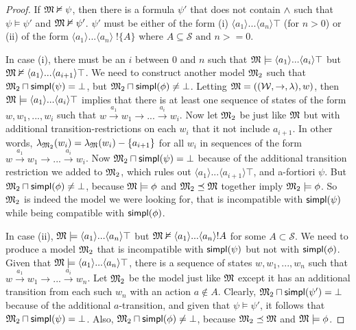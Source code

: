 \begin{proof}
If $\frak{M} \nvDash \psi$, then there is a formula $\psi'$ that does not contain
$\land$ such that $\psi \models \psi'$ and $\frak{M} \nvDash \psi'$. $\psi'$ must be
either of the form (i) $\langle a_1 \rangle ... \langle a_n \rangle
\top$ (for $n > 0$) or (ii) of the form $\langle a_1 \rangle
... \langle a_n \rangle \; !\{A\}$ where $A \subseteq \mathcal{S}
\mbox{ and } n >= 0$.

In case (i), there must be an $i$ between $0$ and $n$ such that $\frak{M}
\models \langle a_1 \rangle ... \langle a_i \rangle \top$ but $\frak{M}
\nvDash \langle a_1 \rangle ... \langle a_{i+1} \rangle \top$. We need
to construct another model $\frak{M}_2$ such that $\frak{M}_2 \sqcap \mathsf{simpl}(\psi) = \bot$,
but $\frak{M}_2 \sqcap \mathsf{simpl}(\phi) \neq \bot$. Letting $\frak{M} =
((\mathcal{W},\rightarrow,\lambda),w)$, then $\frak{M} \models \langle a_1
\rangle ... \langle a_i \rangle \top$ implies that there is at least
one sequence of states of the form $w, w_1, ..., w_i$ such that $w
\xrightarrow{a_1} w_1 \rightarrow ... \xrightarrow{a_i} w_i$.  Now let
$\frak{M}_2$ be just like $\frak{M}$ but with additional transition-restrictions on
each $w_i$ that it not include $a_{i+1}$.  In other words,
$\lambda_{\frak{M}_2}(w_i) = \lambda_\frak{M}(w_i) - \{a_{i+1}\}$ for all $w_i$ in
sequences of the form $w \xrightarrow{a_1} w_1 \rightarrow
... \xrightarrow{a_i} w_i$. Now $\frak{M}_2 \sqcap \mathsf{simpl}(\psi) = \bot$ because of
the additional transition restriction we added to $\frak{M}_2$, which rules out
$\langle a_1 \rangle ... \langle a_{i+1} \rangle \top$, and
a-fortiori $\psi$. But $\frak{M}_2 \sqcap \mathsf{simpl}(\phi) \neq \bot$, because $\frak{M}
\models \phi$ and $\frak{M}_2 \preceq \frak{M}$ together imply $\frak{M}_2 \models \phi$. So $\frak{M}_2$ is
indeed the model we were looking for, that is incompatible with
$\mathsf{simpl}(\psi)$ while being compatible with $\mathsf{simpl}(\phi)$.

In case (ii), $\frak{M} \models \langle a_1 \rangle ... \langle a_n \rangle
\top$ but $\frak{M} \nvDash \langle a_1 \rangle ... \langle a_n \rangle !A$
for some $A \subset \mathcal{S}$. We need to produce a model $\frak{M}_2$ that
is incompatible with $\mathsf{simpl}(\psi)$ but not with $\mathsf{simpl}(\phi)$. Given that
$\frak{M} \models \langle a_1 \rangle ... \langle a_n \rangle \top$, there is
a sequence of states $w, w_1, ..., w_n$ such that $w \xrightarrow{a_1}
w_1 \rightarrow ... \xrightarrow{a_i} w_n$. Let $\frak{M}_2$ be the model just
like $\frak{M}$ except it has an additional transition from each such $w_n$
with an action $a \notin A$. 
Clearly, $\frak{M}_2 \sqcap \mathsf{simpl}(\psi') = \bot$
because of the additional $a$-transition, and given that $\psi \models
\psi'$, it follows that $\frak{M}_2 \sqcap \mathsf{simpl}(\psi) = \bot$. Also, $\frak{M}_2 \sqcap
\mathsf{simpl}(\phi) \neq \bot$, because $\frak{M}_2 \preceq \frak{M}$ and $\frak{M} \models \phi$.


\end{proof}


